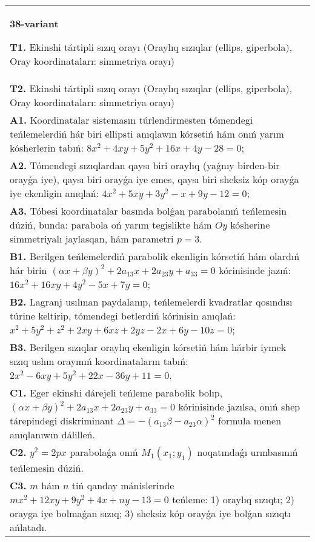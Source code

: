 \documentclass{article}
\begin{document}
\begin{tabular}{m{17cm}}
\textbf{38-variant}
\newline

\textbf{T1.} Ekinshi tártipli sızıq orayı (Oraylıq sızıqlar (ellips, giperbola), Oray koordinataları: simmetriya orayı) \\
\textbf{T2.} Ekinshi tártipli sızıq orayı (Oraylıq sızıqlar (ellips, giperbola), Oray koordinataları: simmetriya orayı) \\
\textbf{A1.} Koordinatalar sistemasın túrlendirmesten tómendegi teńlemelerdiń hár biri ellipsti anıqlawın kórsetiń hám onıń yarım kósherlerin tabıń: $8 x^2+4 x y+5 y^2+16 x+4 y-28=0$; \\
\textbf{A2.} Tómendegi sızıqlardan qaysı biri oraylıq (yaǵnıy birden-bir orayǵa iye), qaysı biri orayǵa iye emes, qaysı biri sheksiz kóp orayǵa iye ekenligin anıqlań: $4 x^2+5 x y+3 y^2-x+9 y-12=0$; \\
\textbf{A3.} Tóbesi koordinatalar basında bolǵan parabolanıń teńlemesin dúziń, bunda: parabola oń yarım tegislikte hám $Oy$ kósherine simmetriyalı jaylasqan, hám parametri $p=3$. \\
\textbf{B1.} Berilgen teńlemelerdiń parabolik ekenligin kórsetiń hám olardıń hár birin $(\alpha x+\beta y)^2+2 a_{13} x+2 a_{23} y+a_{33}=0$ kórinisinde jazıń:  $16 x^2+16 x y+4 y^2-5 x+7 y=0$; \\
\textbf{B2.} Lagranj usılınan paydalanıp, teńlemelerdi kvadratlar qosındısı túrine keltirip, tómendegi betlerdiń kórinisin anıqlań: $x^2+5 y^2+z^2+2 x y+6 x z+2 y z-2 x+6 y-10 z=0$; \\
\textbf{B3.} Berilgen sızıqlar oraylıq ekenligin kórsetiń hám hárbir iymek sızıq ushın orayınıń koordinataların tabıń: $2 x^2-6 x y+5 y^2+22 x-36 y+11=0$. \\
\textbf{C1.} Eger ekinshi dárejeli teńleme parabolik bolıp, $ (\alpha x+\beta y) ^2+2a_{13}x+2a_{23}y+a_{33}=0$ kórinisinde jazılsa, onıń shep tárepindegi diskriminant $\Delta=- (a_{13} \beta-a_{23} \alpha) ^2$ formula menen anıqlanıwın dálilleń. \\
\textbf{C2.} $y^2=2 p x$ parabolaǵa onıń $M_1\left(x_1; y_1\right) $ noqatındaǵı urınbasınıń teńlemesin dúziń. \\
\textbf{C3.} $m$ hám $n$ tiń qanday mánislerinde $m x^2+12 x y+9 y^2+4 x+n y-13=0$ teńleme: 1) oraylıq sızıqtı; 2) orayga iye bolmaǵan sızıq; 3) sheksiz kóp orayǵa iye bolǵan sızıqtı ańlatadı. \\

\end{tabular}
\vspace{1cm}
\end{document}
